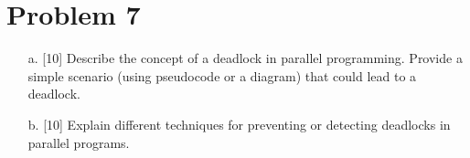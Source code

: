 \documentclass{article}
\begin{document}
\section*{Problem 7}
\begin{enumerate}
    \item[a.] [10] Describe the concept of a deadlock in parallel programming. Provide a simple scenario (using pseudocode or a diagram) that could lead to a deadlock.
    \item[b.] [10] Explain different techniques for preventing or detecting deadlocks in parallel programs.
\end{enumerate}
\end{document}
